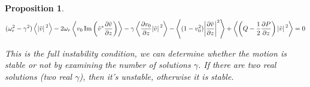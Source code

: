 \documentclass{article}
\theoremstyle{plain}
\newtheorem{proposition}{Proposition}
\theoremstyle{definition}
\theoremstyle{remark}
\theoremstyle{remark}
\begin{document}
\begin{proposition}
    \begin{equation}
        (\omega_r^2-\gamma^2) \expval{\abs*{\tilde{v}}^2} 
        - 2\omega_r\expval{v_0 \Im\left(\tilde{v}^*\pdv{\tilde{v}}{z}\right)} 
        - \gamma\expval{\pdv{v_0}{z}\abs*{\tilde{v}}^2} 
        - \expval{(1-v_0^2)\abs{\pdv{\tilde{v}}{z}}^2 }
        + \expval{\left(Q-\frac{1}{2}\pdv{P}{z}\right)\abs*{\tilde{v}}^2} = 0
        \label{eq:stability-condition}
    \end{equation}

    This is the full instability condition, we can determine whether the motion is stable or not by examining the number of solutions $\gamma$. If there are two real solutions (two real $\gamma$), then it's unstable, otherwise it is stable.
\end{proposition}
\end{document}
